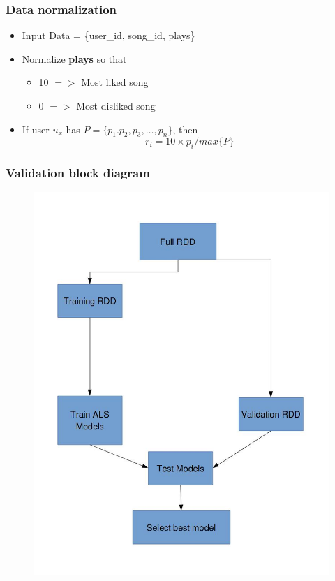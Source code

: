 \documentclass[11pt]{beamer}
\begin{document}
\begin{frame}
  \frametitle{Data normalization}
  \begin{itemize}
    \item Input Data = \{user\_id, song\_id, plays\}
    \item Normalize {\bf plays} so that
      \begin{itemize}
        \item 10 $=>$ Most liked song
        \item 0 $=>$ Most disliked song
      \end{itemize}
    \item If user $u_x$ has $P = \{p_1. p_2, p_3,\dots,p_n	\}$, then
      \begin{equation}
        r_i = 10 \times p_i/max\{P\}
      \end{equation}
  \end{itemize}
\end{frame}


\begin{frame}
  \frametitle{Validation block diagram}
  \begin{figure}
    \includegraphics[width=0.5\linewidth]{figures/Validation.jpg}
  \end{figure}
\end{frame}
\end{document}
